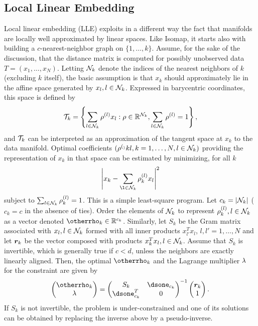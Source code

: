 \subsection{Local Linear Embedding}
\label{sec:lle}
Local linear embedding (LLE) exploits in a different way the fact that manifolds are locally well approximated by linear spaces. Like Isomap, it starts also with building a $c$-nearest-neighbor graph on $\{1, \ldots, k\}$. Assume, for the sake of the discussion, that the distance matrix is computed for possibly unobserved data $T = (x_1, \ldots, x_N)$. 
Letting ${\mathcal N}_k$ denote the indices of the nearest neighbors of $k$ (excluding $k$ itself), the basic assumption is that $x_k$ should approximately lie in the affine space generated by $x_l, l\in {\mathcal N}_k$. Expressed in barycentric coordinates, this space is defined by
\[
{\mathcal T}_k = \left\{  \sum_{l\in{\mathcal N}_k} \rho^{(l)} x_l : \rho\in {\mathbb{R}}^{{\mathcal N}_k}, \sum_{l\in {\mathcal N}_k} \rho^{(l)} = 1 \right\},
\]
and ${\mathcal T}_k$ can be interpreted as an approximation of the tangent space at $x_k$ to the data manifold. Optimal coefficients $(\rho^{(_)}{k} l, k=1, \ldots, N, l\in{\mathcal N}_k)$ providing the representation of $x_k$ in that space can be estimated by minimizing, for all $k$
\[
\left |x_k - \sum_{\l\in\CN_k}\pe {\rho_{k}} l x_l \right|^2
\]  
subject to $\sum_{l\in {\mathcal N}_k} \rho_{k}^{(l)} = 1$. This is a simple least-square program. Let $c_k = |{\mathcal N}_k|$ ($c_k=c$ in the absence of ties).
Order the elements of ${\mathcal N}_k$ to represent $\rho_{k}^{(l)}, l\in{\mathcal N}_k$ as a vector denoted $\bfrho_k\in \mR^{c_k}$. Similarly, let $S_k$ be the Gram matrix associated with $x_l, l\in{\mathcal N}_k$ formed with all inner products $x_{l'}^T x_l$, $l,l'=1, \ldots, N$ and let ${\bm{r}}_k$ be the vector composed with products $x_k^Tx_l, l\in{\mathcal N}_k$. Assume that $S_k$ is invertible, which is generally true if $c < d$, unless the neighbors are exactly linearly aligned. Then, the optimal $\bfrho_k$ and the Lagrange multiplier $\lambda$ for the constraint are given by
\begin{equation}
\label{eq:lle.1}
\begin{pmatrix} \bfrho_k\\ \la\end{pmatrix} = 
\begin{pmatrix} S_k & \dsone_{c_k}\\
\dsone_{c_k}^T & 0
\end{pmatrix}^{-1}
\begin{pmatrix} \bfr_k\\ 1\end{pmatrix}.
\end{equation}
If  $S_k$ is not invertible, the problem is under-constrained and one of its solutions can be obtained by  replacing the inverse above by a pseudo-inverse.

